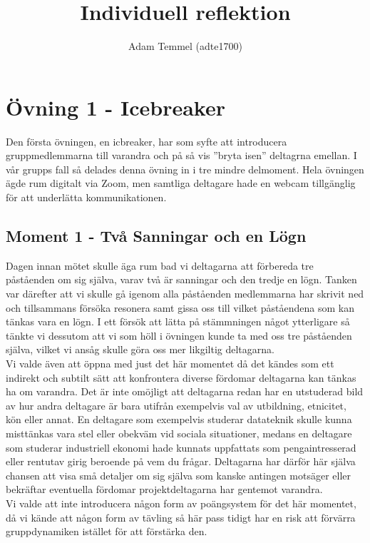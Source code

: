 \documentclass[a4paper, titlepage,12pt]{article}
\title{Individuell reflektion}
\author{Adam Temmel (adte1700)}
\begin{document}
	\maketitle
	\section{Övning 1 - Icebreaker}

		Den första övningen, en icbreaker, har som syfte att introducera gruppmedlemmarna till varandra och på så vis ''bryta isen'' deltagrna emellan. I vår grupps fall så delades denna övning in i tre mindre delmoment. Hela övningen ägde rum digitalt via Zoom, men samtliga deltagare hade en webcam tillgänglig för att underlätta kommunikationen.

		\subsection{Moment 1 - Två Sanningar och en Lögn}

			Dagen innan mötet skulle äga rum bad vi deltagarna att förbereda tre påståenden om sig själva, varav två är sanningar och den tredje en lögn. Tanken var därefter att vi skulle gå igenom alla påståenden medlemmarna har skrivit ned och tillsammans försöka resonera samt gissa oss till vilket påståendena som kan tänkas vara en lögn. I ett försök att lätta på stämmningen något ytterligare så tänkte vi dessutom att vi som höll i övningen kunde ta med oss tre påståenden själva, vilket vi ansåg skulle göra oss mer likgiltig deltagarna.\\

			Vi valde även att öppna med just det här momentet då det kändes som ett indirekt och subtilt sätt att konfrontera diverse fördomar deltagarna kan tänkas ha om varandra. Det är inte omöjligt att deltagarna redan har en utstuderad bild av hur andra deltagare är bara utifrån exempelvis val av utbildning, etnicitet, kön eller annat. En deltagare som exempelvis studerar datateknik skulle kunna misttänkas vara stel eller obekväm vid sociala situationer, medans en deltagare som studerar industriell ekonomi hade kunnats uppfattats som pengaintresserad eller rentutav girig beroende på vem du frågar. Deltagarna har därför här själva chansen att visa små detaljer om sig själva som kanske antingen motsäger eller bekräftar eventuella fördomar projektdeltagarna har gentemot varandra.\\

			Vi valde att inte introducera någon form av poängsystem för det här momentet, då vi kände att någon form av tävling så här pass tidigt har en risk att förvärra gruppdynamiken istället för att förstärka den.
\end{document}
